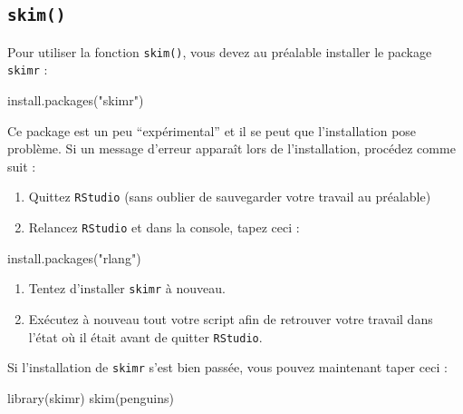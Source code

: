 \documentclass[
  a4paper,
  DIV=11,
  numbers=noendperiod,
  oneside]{scrreprt}
\newenvironment{Shaded}{}{}
\newcommand{\FunctionTok}[1]{\textcolor[rgb]{0.44,0.26,0.76}{#1}}
\newcommand{\NormalTok}[1]{\textcolor[rgb]{0.14,0.16,0.18}{#1}}
\newcommand{\StringTok}[1]{\textcolor[rgb]{0.01,0.18,0.38}{#1}}
\providecommand{\tightlist}{%
  \setlength{\itemsep}{0pt}\setlength{\parskip}{0pt}}\usepackage{longtable,booktabs,array}
\begin{document}
\subsection{\texorpdfstring{\texttt{skim()}}{skim()}}\label{skim}

Pour utiliser la fonction \texttt{skim()}, vous devez au préalable
installer le package \texttt{skimr} :

\begin{Shaded}
\begin{Highlighting}[]
\FunctionTok{install.packages}\NormalTok{(}\StringTok{"skimr"}\NormalTok{)}
\end{Highlighting}
\end{Shaded}

Ce package est un peu ``expérimental'' et il se peut que l'installation
pose problème. Si un message d'erreur apparaît lors de l'installation,
procédez comme suit :

\begin{enumerate}
\def\labelenumi{\arabic{enumi}.}
\tightlist
\item
  Quittez \texttt{RStudio} (sans oublier de sauvegarder votre travail au
  préalable)
\item
  Relancez \texttt{RStudio} et dans la console, tapez ceci :
\end{enumerate}

\begin{Shaded}
\begin{Highlighting}[]
\FunctionTok{install.packages}\NormalTok{(}\StringTok{"rlang"}\NormalTok{)}
\end{Highlighting}
\end{Shaded}

\begin{enumerate}
\def\labelenumi{\arabic{enumi}.}
\setcounter{enumi}{2}
\tightlist
\item
  Tentez d'installer \texttt{skimr} à nouveau.
\item
  Exécutez à nouveau tout votre script afin de retrouver votre travail
  dans l'état où il était avant de quitter \texttt{RStudio}.
\end{enumerate}

Si l'installation de \texttt{skimr} s'est bien passée, vous pouvez
maintenant taper ceci :

\begin{Shaded}
\begin{Highlighting}[]
\FunctionTok{library}\NormalTok{(skimr)}
\FunctionTok{skim}\NormalTok{(penguins)}
\end{Highlighting}
\end{Shaded}
\end{document}
